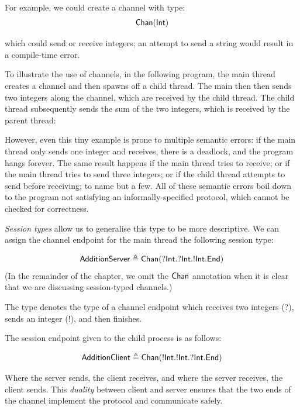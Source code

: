 \documentclass[
graybox,
envcountchap
]{svmult}
\begin{document}
\begin{bibunit}
  For example, we could create a channel with type:
  \[
    \mathsf{Chan}(\mathsf{Int})
  \]


  which could send or receive integers; an attempt to send a string would result
  in a compile-time error.

  To illustrate the use of channels, in the following program, the
  main thread creates a channel and then spawns off a child thread. The main
  then then sends two integers along the channel, which are received by the
  child thread. The child thread subsequently sends the sum of the two integers,
  which is received by the parent thread:


  However, even this tiny example is prone to multiple semantic errors: if the
  main thread only sends one integer and receives, there is a deadlock, and the
  program hangs forever. The same result happens if the main thread tries to
  receive; or if the main thread tries to send three integers; or if the child
  thread attempts to send before receiving; to name but a few. All of these
  semantic errors boil down to the program not satisfying an
  informally-specified protocol, which cannot be checked for correctness.

  \emph{Session types} allow us to generalise this type to be more descriptive.
  We can assign the channel endpoint for the main thread the following session
  type:

  \[
    \mathsf{AdditionServer} \triangleq
    \mathsf{Chan}({?}\mathsf{Int}.{?}\mathsf{Int}.{!}\mathsf{Int}.\mathsf{End})
  \]
  (In the remainder of the chapter, we omit the $\mathsf{Chan}$ annotation when it
  is clear that we are discussing session-typed channels.)

  The  type denotes the type of a channel endpoint which
  receives two integers (?), sends an integer (!), and then finishes.

  The session endpoint given to the child process is as follows:

  \[
    \mathsf{AdditionClient} \triangleq
    \mathsf{Chan}({!}\mathsf{Int}.{!}\mathsf{Int}.{?}\mathsf{Int}.\mathsf{End})
  \]

  Where the server sends, the client receives, and where the server receives,
  the client sends. This \emph{duality} between client and server ensures that
  the two ends of the channel implement the protocol and communicate safely.



\end{bibunit}
\end{document}
